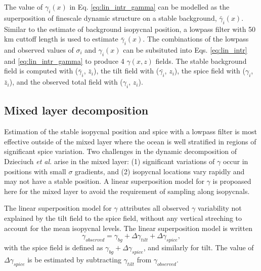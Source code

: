 \documentclass[preprint,NumberedRefs]{JASA}
\begin{document}
The value of $\gamma_i(x)$ in Eq. \eqref{eq:lin_intr_gamma} can be modelled as the superposition of finescale dynamic structure on a stable background, $\bar{\gamma}_i(x)$. Similar to the estimate of background isopycnal position, a lowpass filter with 50 km cuttoff length is used to estimate $\bar{\gamma}_i(x)$. The combinations of the lowpass and observed values of $\sigma_i$ and $\gamma_i(x)$ can be subsituted into Eqs. \eqref{eq:lin_intr} and \eqref{eq:lin_intr_gamma} to produce 4 $\gamma(x,z)$ fields. The stable background field is computed with ($\bar{\gamma}_i$, $\bar{z}_i$), the tilt field with ($\bar{\gamma_i}$, $z_i$), the spice field with ($\gamma_i$, $\bar{z}_i$), and the observed total field with ($\gamma_i$, $z_i$).


\subsection{Mixed layer decomposition}
Estimation of the stable isopycnal position and spice with a lowpass filter is most effective outside of the mixed layer where the ocean is well stratified in regions of significant spice variation. Two challenges in the dynamic decomposition of Dzieciuch \emph{et al.}\citep{dzieciuch2004} arise in the mixed layer: (1) significant variations of $\gamma$ occur in positions with small $\sigma$ gradients, and (2) isopycnal locations vary rapidly and may not have a stable position. A linear superposition model for $\gamma$ is propoased here for the mixed layer to avoid the requirement of sampling along isopycnals.

The linear superposition model for $\gamma$ attributes all observed $\gamma$ variability not explained by the tilt field to the spice field, without any vertical streching to account for the mean isopycnal levels. The linear superposition model is written
\begin{equation}
    \gamma_{observed} = \gamma_{bg} + \Delta \gamma_{tilt} + \Delta \gamma_{spice},
\end{equation}
with the spice field is defined as $\gamma_{bg} + \Delta \gamma_{spice}$, and similarly for tilt. The value of $\Delta \gamma_{spice}$ is be estimated by subtracting $\gamma_{tilt}$ from $\gamma_{observed}$.
\end{document}
